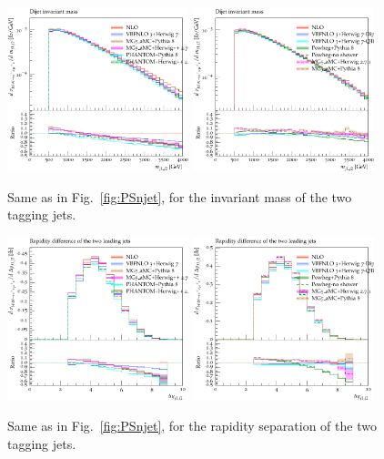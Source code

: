 \begin{figure}[hbt]
\centering
\includegraphics[width=0.47\textwidth]{figures/LOPS/m_jj.pdf}
\includegraphics[width=0.47\textwidth]{figures/NLOPS/m_jj.pdf}
\caption{Same as in Fig.~\protect\ref{fig:PSnjet}, for the invariant mass of the two tagging jets.}
\label{fig:PSmjj}
\end{figure}

\begin{figure}[hbt]
\centering
\includegraphics[width=0.47\textwidth]{figures/LOPS/Deltay_jj.pdf}
\includegraphics[width=0.47\textwidth]{figures/NLOPS/Deltay_jj.pdf}
\caption{Same as in Fig.~\protect\ref{fig:PSnjet}, for the rapidity separation of the two tagging jets.}
\label{fig:PSdyjj}
\end{figure}

